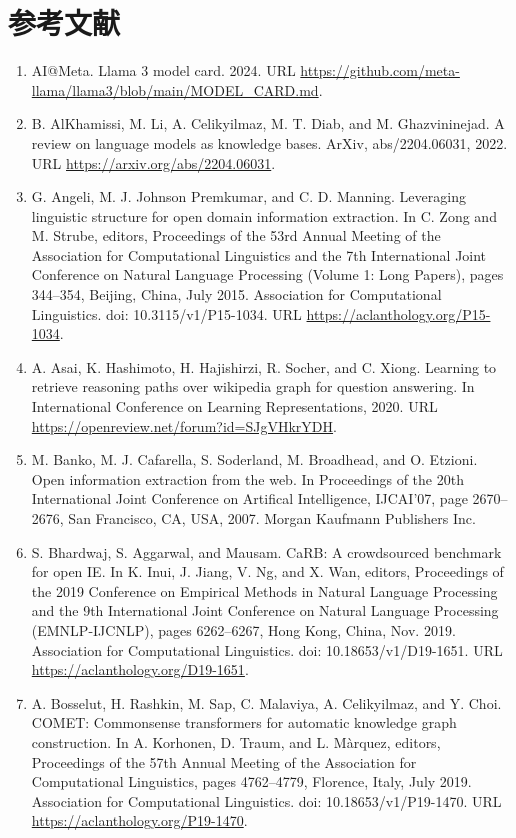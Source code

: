 \documentclass[11pt,UTF8,fontset=fandol]{ctexart}
\begin{document}
\section*{参考文献}
\begin{enumerate}[leftmargin=2em]
\item AI@Meta. Llama 3 model card. 2024. URL \url{https://github.com/meta-llama/llama3/blob/main/MODEL_CARD.md}.
\item B. AlKhamissi, M. Li, A. Celikyilmaz, M. T. Diab, and M. Ghazvininejad. A review on language models as knowledge bases. ArXiv, abs/2204.06031, 2022. URL \url{https://arxiv.org/abs/2204.06031}.
\item G. Angeli, M. J. Johnson Premkumar, and C. D. Manning. Leveraging linguistic structure for open domain information extraction. In C. Zong and M. Strube, editors, Proceedings of the 53rd Annual Meeting of the Association for Computational Linguistics and the 7th International Joint Conference on Natural Language Processing (Volume 1: Long Papers), pages 344--354, Beijing, China, July 2015. Association for Computational Linguistics. doi: 10.3115/v1/P15-1034. URL \url{https://aclanthology.org/P15-1034}.
\item A. Asai, K. Hashimoto, H. Hajishirzi, R. Socher, and C. Xiong. Learning to retrieve reasoning paths over wikipedia graph for question answering. In International Conference on Learning Representations, 2020. URL \url{https://openreview.net/forum?id=SJgVHkrYDH}.
\item M. Banko, M. J. Cafarella, S. Soderland, M. Broadhead, and O. Etzioni. Open information extraction from the web. In Proceedings of the 20th International Joint Conference on Artifical Intelligence, IJCAI'07, page 2670--2676, San Francisco, CA, USA, 2007. Morgan Kaufmann Publishers Inc.
\item S. Bhardwaj, S. Aggarwal, and Mausam. CaRB: A crowdsourced benchmark for open IE. In K. Inui, J. Jiang, V. Ng, and X. Wan, editors, Proceedings of the 2019 Conference on Empirical Methods in Natural Language Processing and the 9th International Joint Conference on Natural Language Processing (EMNLP-IJCNLP), pages 6262--6267, Hong Kong, China, Nov. 2019. Association for Computational Linguistics. doi: 10.18653/v1/D19-1651. URL \url{https://aclanthology.org/D19-1651}.
\item A. Bosselut, H. Rashkin, M. Sap, C. Malaviya, A. Celikyilmaz, and Y. Choi. COMET: Commonsense transformers for automatic knowledge graph construction. In A. Korhonen, D. Traum, and L. M\`arquez, editors, Proceedings of the 57th Annual Meeting of the Association for Computational Linguistics, pages 4762--4779, Florence, Italy, July 2019. Association for Computational Linguistics. doi: 10.18653/v1/P19-1470. URL \url{https://aclanthology.org/P19-1470}.

\end{enumerate}
\end{document}
